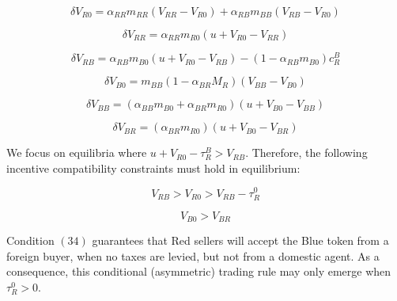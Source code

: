 \begin{equation}
        \delta V_{R0}= \alpha_{RR}m_{RR}\left( V_{RR}-V_{R0} \right) + \alpha_{RB}m_{BB} \left( V_{RB}-V_{R0} \right)
\end{equation}

\begin{equation}
        \delta V_{RR}= \alpha_{RR}m_{R0} \left(u+ V_{R0}-V_{RR} \right)
\end{equation}

\begin{equation}
        \delta V_{RB}= \alpha_{RB}m_{B0} \left(u+ V_{R0}-V_{RB} \right) - \left( 1 - \alpha_{RB}m_{B0}\right)c^B_R
\end{equation}

\begin{equation}
        \delta V_{B0}=m_{BB}\left( 1-\alpha_{BR}M_{R}\right)\left( V_{BB}-V_{B0} \right)
\end{equation}

 \begin{equation}
        \delta V_{BB}=\left( \alpha_{BB}m_{B0}+\alpha_{BR}m_{R0} \right)\left(u+ V_{B0}-V_{BB} \right)
\end{equation}

\begin{equation}
        \delta V_{BR}=\left(\alpha_{BR}m_{R0}\right)\left(u+ V_{B0}-V_{BR} \right) 
\end{equation}

We focus on equilibria where $u+V_{R0}-\tau_{R}^{B}>V_{RB}$. Therefore, the following incentive compatibility constraints must hold in equilibrium:

\begin{equation}
    V_{RB}>V_{R0}>V_{RB}-\tau_{R}^{0}
\end{equation}

\begin{equation}
    V_{B0}>V_{BR}
\end{equation}

Condition $(34)$ guarantees that Red sellers will accept the Blue token from a foreign buyer, when no taxes are levied, but not from a domestic agent. As a consequence, this conditional (asymmetric) trading rule may only emerge when $\tau_{R}^{0}>0$.

